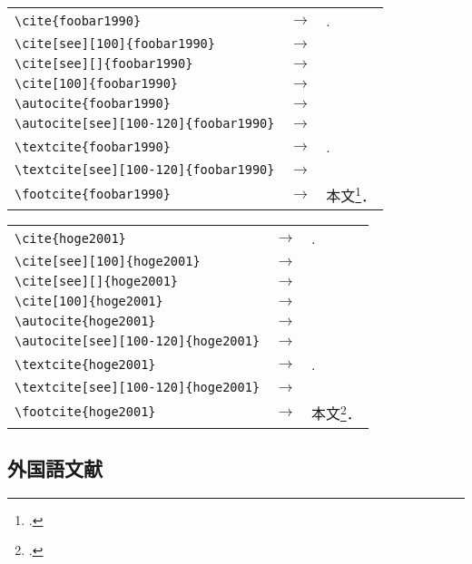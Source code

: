 \begin{tabular}{lll}
\verb|\cite{foobar1990}| & $\rightarrow$ &  \cite{foobar1990}. \\
\verb|\cite[see][100]{foobar1990}| & $\rightarrow$ &  \cite[see][100]{foobar1990} \\
\verb|\cite[see][]{foobar1990}| & $\rightarrow$ &  \cite[see][]{foobar1990} \\
\verb|\cite[100]{foobar1990}| & $\rightarrow$ &  \cite[100]{foobar1990} \\
\verb|\autocite{foobar1990}| & $\rightarrow$ &  \autocite{foobar1990} \\
\verb|\autocite[see][100-120]{foobar1990}| & $\rightarrow$ &  \autocite[see][100-120]{foobar1990} \\
\verb|\textcite{foobar1990}| & $\rightarrow$ &  \textcite{foobar1990}. \\
\verb|\textcite[see][100-120]{foobar1990}| & $\rightarrow$ &  \textcite[see][100-120]{foobar1990} \\
\verb|\footcite{foobar1990}| & $\rightarrow$ &  本文\footcite{foobar1990}． \\
\end{tabular}

\begin{tabular}{lll}
\verb|\cite{hoge2001}| & $\rightarrow$ &  \cite{hoge2001}. \\
\verb|\cite[see][100]{hoge2001}| & $\rightarrow$ &  \cite[see][100]{hoge2001} \\
\verb|\cite[see][]{hoge2001}| & $\rightarrow$ &  \cite[see][]{hoge2001} \\
\verb|\cite[100]{hoge2001}| & $\rightarrow$ &  \cite[100]{hoge2001} \\
\verb|\autocite{hoge2001}| & $\rightarrow$ &  \autocite{hoge2001} \\
\verb|\autocite[see][100-120]{hoge2001}| & $\rightarrow$ &  \autocite[see][100-120]{hoge2001} \\
\verb|\textcite{hoge2001}| & $\rightarrow$ &  \textcite{hoge2001}. \\
\verb|\textcite[see][100-120]{hoge2001}| & $\rightarrow$ &  \textcite[see][100-120]{hoge2001} \\
\verb|\footcite{hoge2001}| & $\rightarrow$ &  本文\footcite{hoge2001}． \\
\end{tabular}

\vspace{2em}

\subsection{外国語文献}

